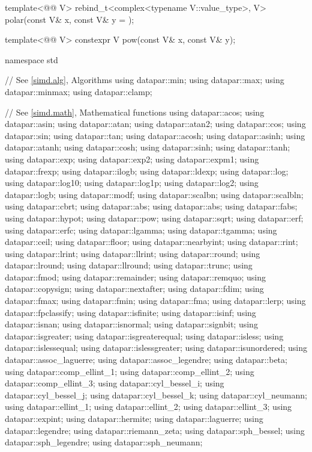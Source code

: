 \begin{codeblock}
{  template<@@ V>
    rebind_t<complex<typename V::value_type>, V> polar(const V& x, const V& y = {});

  template<@@ V> constexpr V pow(const V& x, const V& y);
}

namespace std {
  // See \ref{simd.alg}, Algorithms
  using datapar::min;
  using datapar::max;
  using datapar::minmax;
  using datapar::clamp;

  // See \ref{simd.math}, Mathematical functions
  using datapar::acos;
  using datapar::asin;
  using datapar::atan;
  using datapar::atan2;
  using datapar::cos;
  using datapar::sin;
  using datapar::tan;
  using datapar::acosh;
  using datapar::asinh;
  using datapar::atanh;
  using datapar::cosh;
  using datapar::sinh;
  using datapar::tanh;
  using datapar::exp;
  using datapar::exp2;
  using datapar::expm1;
  using datapar::frexp;
  using datapar::ilogb;
  using datapar::ldexp;
  using datapar::log;
  using datapar::log10;
  using datapar::log1p;
  using datapar::log2;
  using datapar::logb;
  using datapar::modf;
  using datapar::scalbn;
  using datapar::scalbln;
  using datapar::cbrt;
  using datapar::abs;
  using datapar::abs;
  using datapar::fabs;
  using datapar::hypot;
  using datapar::pow;
  using datapar::sqrt;
  using datapar::erf;
  using datapar::erfc;
  using datapar::lgamma;
  using datapar::tgamma;
  using datapar::ceil;
  using datapar::floor;
  using datapar::nearbyint;
  using datapar::rint;
  using datapar::lrint;
  using datapar::llrint;
  using datapar::round;
  using datapar::lround;
  using datapar::llround;
  using datapar::trunc;
  using datapar::fmod;
  using datapar::remainder;
  using datapar::remquo;
  using datapar::copysign;
  using datapar::nextafter;
  using datapar::fdim;
  using datapar::fmax;
  using datapar::fmin;
  using datapar::fma;
  using datapar::lerp;
  using datapar::fpclassify;
  using datapar::isfinite;
  using datapar::isinf;
  using datapar::isnan;
  using datapar::isnormal;
  using datapar::signbit;
  using datapar::isgreater;
  using datapar::isgreaterequal;
  using datapar::isless;
  using datapar::islessequal;
  using datapar::islessgreater;
  using datapar::isunordered;
  using datapar::assoc_laguerre;
  using datapar::assoc_legendre;
  using datapar::beta;
  using datapar::comp_ellint_1;
  using datapar::comp_ellint_2;
  using datapar::comp_ellint_3;
  using datapar::cyl_bessel_i;
  using datapar::cyl_bessel_j;
  using datapar::cyl_bessel_k;
  using datapar::cyl_neumann;
  using datapar::ellint_1;
  using datapar::ellint_2;
  using datapar::ellint_3;
  using datapar::expint;
  using datapar::hermite;
  using datapar::laguerre;
  using datapar::legendre;
  using datapar::riemann_zeta;
  using datapar::sph_bessel;
  using datapar::sph_legendre;
  using datapar::sph_neumann;

}
\end{codeblock}
